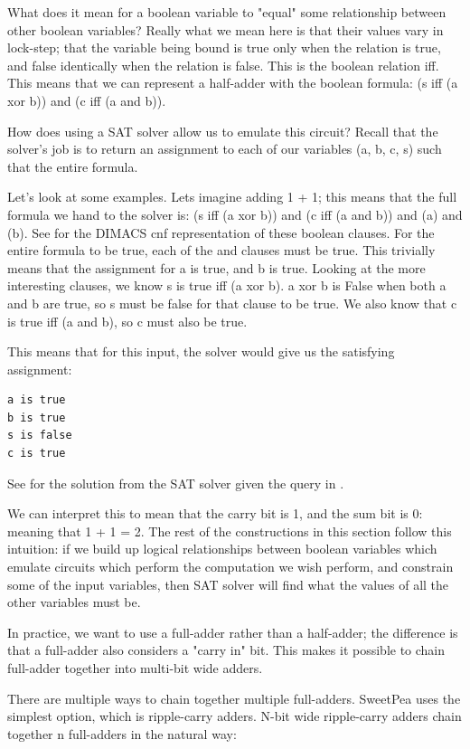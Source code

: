 What does it mean for a boolean variable to "equal" some relationship between other boolean variables? Really what we mean here is that their values vary in lock-step; that the variable being bound is true only when the relation is true, and false identically when the relation is false. This is the boolean relation iff. This means that we can represent a half-adder with the boolean formula:
(s iff (a xor b)) and (c iff (a and b)).

How does using a SAT solver allow us to emulate this circuit? Recall that the solver's job is to return an assignment to each of our variables (a, b, c, s) such that the entire formula.

Let's look at some examples. Lets imagine adding 1 + 1; this means that the full formula we hand to the solver is:
(s iff (a xor b)) and (c iff (a and b)) and (a) and (b). See  for the DIMACS cnf representation of these boolean clauses.
For the entire formula to be true, each of the and clauses must be true. This trivially means that the assignment for a is true, and b is true. Looking at the more interesting clauses, we know s is true iff (a xor b). a xor b is False when both a and b are true, so s must be false for that clause to be true. We also know that c is true iff (a and b), so c must also be true.

This means that for this input, the solver would give us the satisfying assignment:
\begin{verbatim}
a is true
b is true
s is false
c is true
\end{verbatim}

See  for the solution from the SAT solver given the query in .

We can interpret this to mean that the carry bit is 1, and the sum bit is 0: meaning that 1 + 1 = 2. The rest of the constructions in this section follow this intuition: if we build up logical relationships between boolean variables which emulate circuits which perform the computation we wish perform, and constrain some of the input variables, then SAT solver will find what the values of all the other variables must be.

In practice, we want to use a full-adder rather than a half-adder; the difference is that a full-adder also considers a "carry in" bit. This makes it possible to chain full-adder together into multi-bit wide adders.

There are multiple ways to chain together multiple full-adders. SweetPea uses the simplest option, which is ripple-carry adders. N-bit wide ripple-carry adders chain together n full-adders in the natural way:

